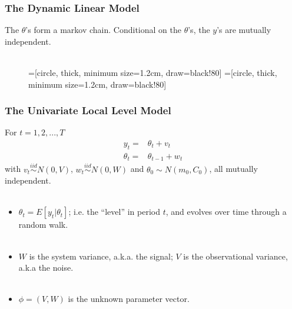 \documentclass[xcolor=dvipsnames]{beamer}
\begin{document}
\begin{frame}[fragile]
  \frametitle{The Dynamic Linear Model} 
  The $\theta$'s form a markov chain. Conditional on the $\theta$'s, the $y$'s are mutually independent.\\~\\
\begin{figure}
  \centering
    =[circle, thick, minimum size=1.2cm, draw=black!80]
    =[circle, thick, minimum size=1.2cm, draw=black!80]
  \end{figure}
\end{frame}



\begin{frame}
 \frametitle{The Univariate Local Level Model}
For $t=1,2,...,T$
\begin{align*}
    y_t  =&\theta_t +  v_t\\
    \theta_t =& \theta_{t-1} + w_t
  \end{align*} 
  with $v_t\stackrel{iid}{\sim}N(0,V)$, $w_t\stackrel{iid}{\sim}N(0,W)$ and $\theta_0\sim N(m_0,C_0)$, all mutually independent.\pause\\~\\
  \begin{itemize}%
  \item $\theta_t=E[y_t|\theta_t]$; i.e. the ``level'' in period $t$, and evolves over time through a random walk.\pause\\~\\
  \item $W$ is the system variance, a.k.a. the signal; $V$ is the observational variance, a.k.a the noise.\\~\\
  \item $\phi=(V,W)$ is the unknown parameter vector.
  \end{itemize}
\end{frame}
\end{document}
